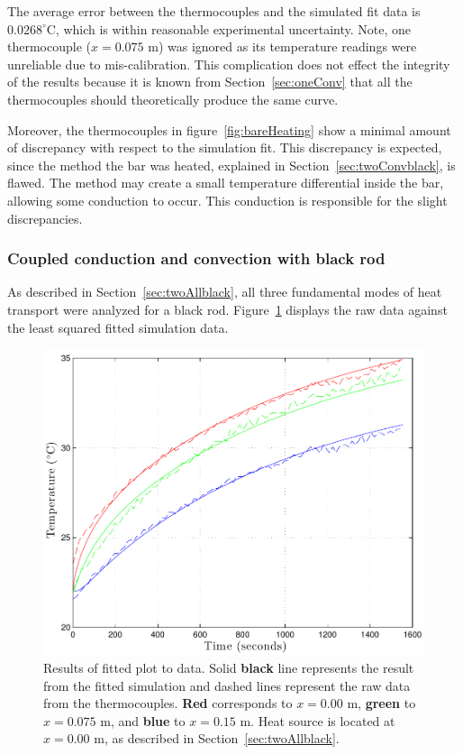 \documentclass[10pt,aps,prb,twocolumn, nofootinbib]{revtex4-1}
\begin{document}
\noindent The average error between the thermocouples and the simulated fit data is $0.0268 ^\circ$C, which is within reasonable experimental uncertainty. Note, one thermocouple ($x = 0.075 \text{ m}$) was ignored as its temperature readings were unreliable due to mis-calibration. This complication does not effect the integrity of the results because it is known from Section~\ref{sec:oneConv} that all the thermocouples should theoretically produce the same curve. 

Moreover, the thermocouples in figure~\ref{fig:bareHeating} show a minimal amount of discrepancy with respect to the simulation fit. This discrepancy is expected, since the method the bar was heated, explained in Section~\ref{sec:twoConvblack}, is flawed. The method may create a small temperature differential inside the bar, allowing some conduction to occur. This conduction is responsible for the slight discrepancies.

\subsubsection{\label{sec:threeAllblack} Coupled conduction and convection with black rod}

As described in Section~\ref{sec:twoAllblack}, all three fundamental modes of heat transport were analyzed for a black rod. Figure~\ref{fig:allThreeBlack} displays the raw data against the least squared fitted simulation data.

\begin{figure}[h!]
\centering
\includegraphics[width=1.0\linewidth]{allThreeblack}
\caption{Results of fitted plot to data. Solid \textbf{black} line represents the result from the fitted simulation and dashed lines represent the raw data from the thermocouples. {\color{red}\textbf{Red}} corresponds to $x = 0.00$ m, {\color{green}\textbf{green}} to $x = 0.075$ m, and {\color{blue}\textbf{blue}} to $x = 0.15$ m. Heat source is located at $x= 0.00$ m, as described in Section~\ref{sec:twoAllblack}.}
\label{fig:allThreeBlack}
\end{figure}
\end{document}
